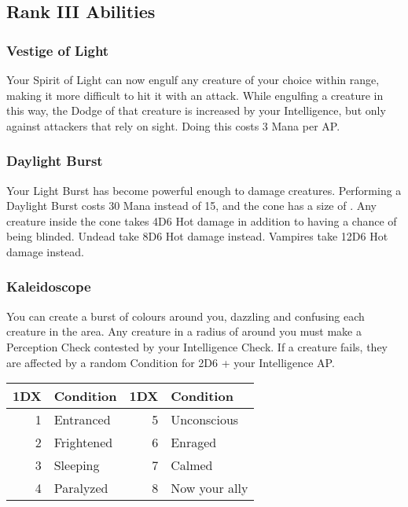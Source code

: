 \subsection{Rank III Abilities}

\subsubsection{Vestige of Light}
Your Spirit of Light can now engulf any creature of your choice within range, making it more difficult to hit it with an attack.
While engulfing a creature in this way, the Dodge of that creature is increased by your Intelligence, but only against attackers that rely on sight.
Doing this costs 3 Mana per AP.

\subsubsection{Daylight Burst}
Your Light Burst has become powerful enough to damage creatures.
Performing a Daylight Burst costs 30 Mana instead of 15, and the cone has a size of .
Any creature inside the cone takes 4D6 Hot damage in addition to having a chance of being blinded.
Undead take 8D6 Hot damage instead.
Vampires take 12D6 Hot damage instead.

\subsubsection{Kaleidoscope}
You can create a burst of colours around you, dazzling and confusing each creature in the area.
Any creature in a radius of  around you must make a Perception Check contested by your Intelligence Check.
If a creature fails, they are affected by a random Condition for 2D6 + your Intelligence AP.\\

\begin{tabular}{r | l || r | l}
	1DX & Condition & 1DX & Condition\\
	\hline
	1 & Entranced & 5 & Unconscious \\
	2 & Frightened & 6 & Enraged \\
	3 & Sleeping & 7 & Calmed\\
	4 & Paralyzed & 8 & Now your ally \\
\end{tabular}